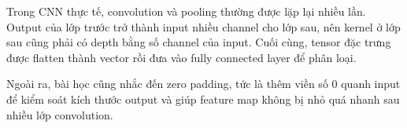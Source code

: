 Trong CNN thực tế, convolution và pooling thường được lặp lại nhiều lần. Output của lớp trước trở thành input nhiều channel cho lớp sau, nên kernel ở lớp sau cũng phải có depth bằng số channel của input. Cuối cùng, tensor đặc trưng được flatten thành vector rồi đưa vào fully connected layer để phân loại.

Ngoài ra, bài học cũng nhắc đến zero padding, tức là thêm viền số 0 quanh input để kiểm soát kích thước output và giúp feature map không bị nhỏ quá nhanh sau nhiều lớp convolution.
